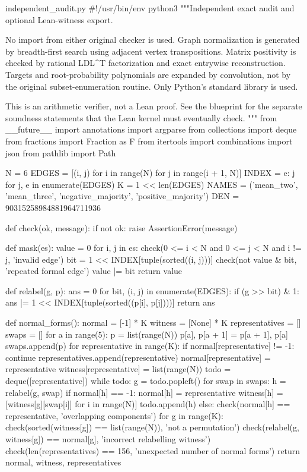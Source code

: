 \begin{filecontents*}[overwrite]{independent_audit.py}
#!/usr/bin/env python3
"""Independent exact audit and optional Lean-witness export.

No import from either original checker is used. Graph normalization is generated
by breadth-first search using adjacent vertex transpositions. Matrix positivity
is checked by rational LDL^T factorization and exact entrywise reconstruction.
Targets and root-probability polynomials are expanded by convolution, not by the
original subset-enumeration routine. Only Python's standard library is used.

This is an arithmetic verifier, not a Lean proof. See the blueprint for the
separate soundness statements that the Lean kernel must eventually check.
"""
from __future__ import annotations
import argparse
from collections import deque
from fractions import Fraction as F
from itertools import combinations
import json
from pathlib import Path

N = 6
EDGES = [(i, j) for i in range(N) for j in range(i + 1, N)]
INDEX = {e: j for j, e in enumerate(EDGES)}
K = 1 << len(EDGES)
NAMES = ('mean_two', 'mean_three', 'negative_majority', 'positive_majority')
DEN = 90315258984881964711936


def check(ok, message):
    if not ok:
        raise AssertionError(message)


def mask(es):
    value = 0
    for i, j in es:
        check(0 <= i < N and 0 <= j < N and i != j, 'invalid edge')
        bit = 1 << INDEX[tuple(sorted((i, j)))]
        check(not value & bit, 'repeated formal edge')
        value |= bit
    return value


def relabel(g, p):
    ans = 0
    for bit, (i, j) in enumerate(EDGES):
        if (g >> bit) & 1:
            ans |= 1 << INDEX[tuple(sorted((p[i], p[j])))]
    return ans


def normal_forms():
    normal = [-1] * K
    witness = [None] * K
    representatives = []
    swaps = []
    for a in range(5):
        p = list(range(N))
        p[a], p[a + 1] = p[a + 1], p[a]
        swaps.append(p)
    for representative in range(K):
        if normal[representative] != -1:
            continue
        representatives.append(representative)
        normal[representative] = representative
        witness[representative] = list(range(N))
        todo = deque([representative])
        while todo:
            g = todo.popleft()
            for swap in swaps:
                h = relabel(g, swap)
                if normal[h] == -1:
                    normal[h] = representative
                    witness[h] = [witness[g][swap[i]] for i in range(N)]
                    todo.append(h)
                else:
                    check(normal[h] == representative, 'overlapping components')
    for g in range(K):
        check(sorted(witness[g]) == list(range(N)), 'not a permutation')
        check(relabel(g, witness[g]) == normal[g], 'incorrect relabelling witness')
    check(len(representatives) == 156, 'unexpected number of normal forms')
    return normal, witness, representatives



\end{filecontents*}
